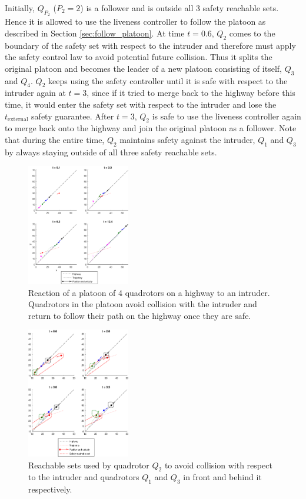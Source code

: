 Initially, $Q_{P_2}$ ($P_2=2$) is a follower and is outside all 3 safety reachable sets. Hence it is allowed to use the liveness controller to follow the platoon as described in Section \ref{sec:follow_platoon}. At time $t=0.6$, $Q_2$ comes to the boundary of the safety set with respect to the intruder and therefore must apply the safety control law to avoid potential future collision. Thus it splits the original platoon and becomes the leader of a new platoon consisting of itself, $Q_3$ and $Q_4$. $Q_2$ keeps using the safety controller until it is safe with respect to the intruder again at $t=3$, since if it tried to merge back to the highway before this time, it would enter the safety set with respect to the intruder and lose the $t_\text{external}$ safety guarantee. After $t=3$, $Q_2$ is safe to use the liveness controller again to merge back onto the highway and join the original platoon as a follower. Note that during the entire time, $Q_2$ maintains safety against the intruder, $Q_1$ and $Q_3$ by always staying outside of all three safety reachable sets.


\begin{figure}
	\centering
	\includegraphics[width=0.4\textwidth]{"Intruder1"}
	\caption{Reaction of a platoon of 4 quadrotors on a highway to an intruder. Quadrotors in the platoon avoid collision with the intruder and return to follow their path on the highway once they are safe.}
	\label{fig:intruder1}
\end{figure}

\begin{figure}
	\centering
		\includegraphics[width=0.4\textwidth]{"Intruder2"}
	\caption{Reachable sets used by quadrotor $Q_2$ to avoid collision with respect to the intruder and quadrotors $Q_1$ and $Q_3$ in front and behind it respectively.}
	\label{fig:intruder2}
\end{figure}

